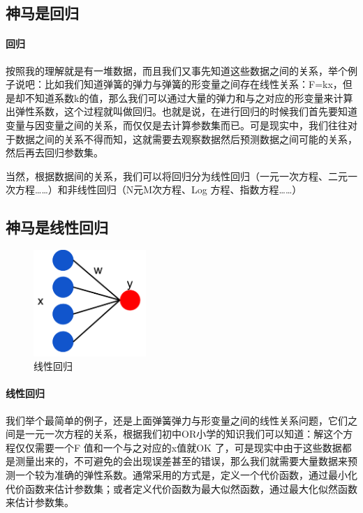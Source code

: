 \documentclass[a4paper, 11pt, UTF8]{ctexart} %
\begin{document}
\subsection{神马是回归}
\paragraph{回归}按照我的理解就是有一堆数据，而且我们又事先知道这些数据之间的关系，举个例子说吧：比如我们知道弹簧的弹力与弹簧的形变量之间存在线性关系：F=kx，但是却不知道系数k的值，那么我们可以通过大量的弹力和与之对应的形变量来计算出弹性系数，这个过程就叫做回归。也就是说，在进行回归的时候我们首先要知道变量与因变量之间的关系，而仅仅是去计算参数集而已。可是现实中，我们往往对于数据之间的关系不得而知，这就需要去观察数据然后预测数据之间可能的关系，然后再去回归参数集。

当然，根据数据间的关系，我们可以将回归分为线性回归（一元一次方程、二元一次方程……）和非线性回归（N元M次方程、Log 方程、指数方程……）

\subsection{神马是线性回归}

\begin{figure}[H]
\centering
\includegraphics[width=0.38\textwidth,height=0.38\textwidth]{1.png}
\caption{线性回归}
\end{figure}
\paragraph{线性回归}我们举个最简单的例子，还是上面弹簧弹力与形变量之间的线性关系问题，它们之间是一元一次方程的关系，根据我们初中OR小学的知识我们可以知道：解这个方程仅仅需要一个F 值和一个与之对应的x值就OK 了，可是现实中由于这些数据都是测量出来的，不可避免的会出现误差甚至的错误，那么我们就需要大量数据来预测一个较为准确的弹性系数。通常采用的方式是，定义一个代价函数，通过最小化代价函数来估计参数集；或者定义代价函数为最大似然函数，通过最大化似然函数来估计参数集。
\end{document}

